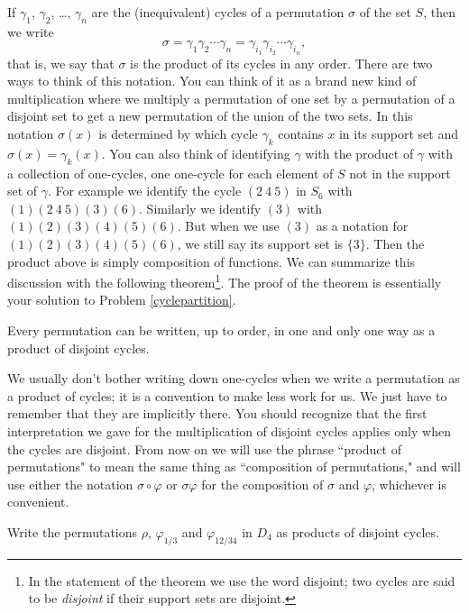  If
$\gamma_1$,
$\gamma_2$,
\ldots, $\gamma_n$  are the (inequivalent) cycles of a
permutation
$\sigma$ of the set $S$, then we write
$$\sigma = \gamma_1\gamma_2\cdots\gamma_n= \gamma_{i_1}\gamma_{i_2}
\cdots \gamma_{i_n},$$
that is, we say that $\sigma$ is the product of its cycles in any order. 
There are two ways to think of this notation.  You can think of it as a
brand new kind of multiplication where we multiply a permutation of one
set by a permutation of  a disjoint set to get a new permutation of the
union of the two sets. In this notation $\sigma(x)$ is determined by which
cycle $\gamma_k$ contains $x$ in its support set and $\sigma(x) =
\gamma_k(x)$. You can also think of identifying
$\gamma$ with the product of $\gamma$ with a collection of one-cycles, one
one-cycle for each element of $S$ not in the support set of $\gamma$. For example we
identify the  cycle $(2\  4\ 5)$ in $S_6$ with $(1)(2\  4\ 5)(3)(6)$. Similarly we
identify $(3)$ with $(1)(2)(3)(4)(5)(6)$.  But when we use $(3)$ as a notation for
$(1)(2)(3)(4)(5)(6)$, we still say its support set is $\{3\}$.  Then the product above
is simply composition of functions.  We can summarize this discussion with the
following theorem\footnote{In the
statement of the theorem we use the word disjoint; two cycles are said to be {\em
disjoint} if their support sets are disjoint.}.  The proof of the theorem is
essentially your solution to Problem
\ref{cyclepartition}.

\begin{theorem} Every permutation can be written, up to order, in one and
only one way as a product of disjoint cycles.\end{theorem}

We usually don't bother writing down one-cycles when we write a permutation as a
product of cycles; it is a convention to make less work for us.  We just have to
remember that they are implicitly there. You should recognize that the first
interpretation we gave for the multiplication of disjoint cycles applies only when the
cycles are disjoint.  From now on  we will use the phrase ``product of permutations"
to mean the same thing as ``composition of permutations," and will use either the
notation
$\sigma\circ\varphi$ or
$\sigma\varphi$ for the composition of
$\sigma$ and $\varphi$, whichever is convenient.

\bp
\iteme Write the permutations $\rho$, $\varphi_{1/3}$ and $\varphi_{12/34}$
in $D_4$ as products of disjoint cycles.

